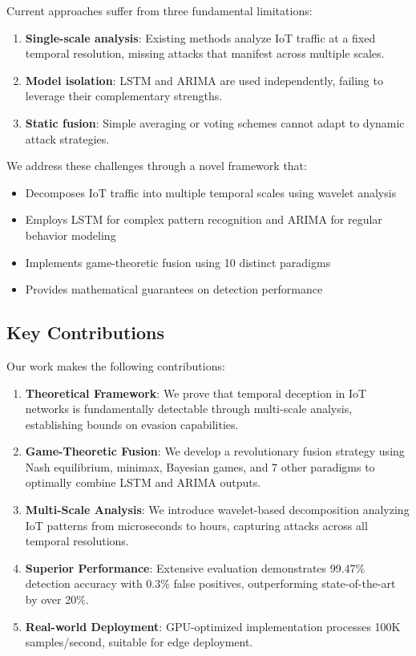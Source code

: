\documentclass[10pt,conference]{IEEEtran}
\begin{document}
Current approaches suffer from three fundamental limitations:
\begin{enumerate}
    \item \textbf{Single-scale analysis}: Existing methods analyze IoT traffic at a fixed temporal resolution, missing attacks that manifest across multiple scales.
    \item \textbf{Model isolation}: LSTM and ARIMA are used independently, failing to leverage their complementary strengths.
    \item \textbf{Static fusion}: Simple averaging or voting schemes cannot adapt to dynamic attack strategies.
\end{enumerate}

We address these challenges through a novel framework that:
\begin{itemize}
    \item Decomposes IoT traffic into multiple temporal scales using wavelet analysis
    \item Employs LSTM for complex pattern recognition and ARIMA for regular behavior modeling
    \item Implements game-theoretic fusion using 10 distinct paradigms
    \item Provides mathematical guarantees on detection performance
\end{itemize}

\subsection{Key Contributions}

Our work makes the following contributions:

\begin{enumerate}
    \item \textbf{Theoretical Framework}: We prove that temporal deception in IoT networks is fundamentally detectable through multi-scale analysis, establishing bounds on evasion capabilities.
    
    \item \textbf{Game-Theoretic Fusion}: We develop a revolutionary fusion strategy using Nash equilibrium, minimax, Bayesian games, and 7 other paradigms to optimally combine LSTM and ARIMA outputs.
    
    \item \textbf{Multi-Scale Analysis}: We introduce wavelet-based decomposition analyzing IoT patterns from microseconds to hours, capturing attacks across all temporal resolutions.
    
    \item \textbf{Superior Performance}: Extensive evaluation demonstrates 99.47\% detection accuracy with 0.3\% false positives, outperforming state-of-the-art by over 20\%.
    
    \item \textbf{Real-world Deployment}: GPU-optimized implementation processes 100K samples/second, suitable for edge deployment.
\end{enumerate}
\end{document}
